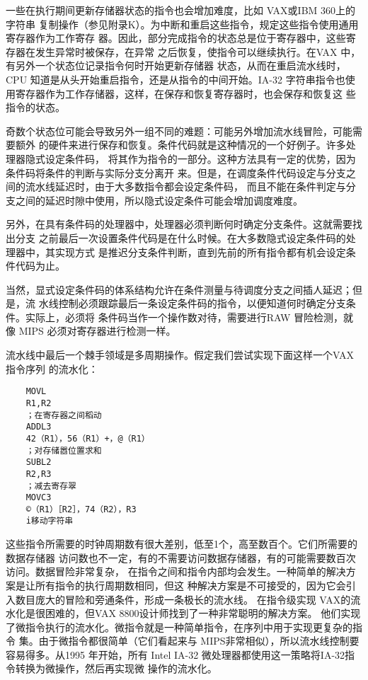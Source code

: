 一些在执行期间更新存储器状态的指令也会增加难度，比如 VAX或IBM 360上的字符串
复制操作（参见附录K）。为中断和重启这些指令，规定这些指令使用通用寄存器作为工作寄存
器。因此，部分完成指令的状态总是位于寄存器中，这些寄存器在发生异常时被保存，在异常
之后恢复，使指令可以继续执行。在VAX 中，有另外一个状态位记录指令何时开始更新存储器
状态，从而在重启流水线时，CPU 知道是从头开始重启指令，还是从指令的中间开始。IA-32
字符串指令也使用寄存器作为工作存储器，这样，在保存和恢复寄存器时，也会保存和恢复这
些指令的状态。

奇数个状态位可能会导致另外一组不同的难题：可能另外增加流水线冒险，可能需要额外
的硬件来进行保存和恢复。条件代码就是这种情况的一个好例子。许多处理器隐式设定条件码，
将其作为指令的一部分。这种方法具有一定的优势，因为条件码将条件的判断与实际分支分离开
来。但是，在调度条件代码设定与分支之间的流水线延迟时，由于大多数指令都会设定条件码，
而且不能在条件判定与分支之间的延迟时隙中使用，所以隐式设定条件可能会增加调度难度。

另外，在具有条件码的处理器中，处理器必须判断何时确定分支条件。这就需要找出分支
之前最后一次设置条件代码是在什么时候。在大多数隐式设定条件码的处理器中，其实现方式
是推迟分支条件判断，直到先前的所有指令都有机会设定条件代码为止。

当然，显式设定条件码的体系结构允许在条件测量与待调度分支之间插人延迟；但是，流
水线控制必须跟踪最后一条设定条件码的指令，以便知道何时确定分支条件。实际上，必须将
条件码当作一个操作数对待，需要进行RAW 冒险检测，就像 MIPS 必须对寄存器进行检测一样。

流水线中最后一个棘手领域是多周期操作。假定我们尝试实现下面这样一个VAX 指令序列
的流水化：
\begin{verbatim}
    MOVL
    R1,R2
    ；在寄存器之间稻动
    ADDL3
    42（R1），56（R1）+，@（R1）
    ；对存储嚣位置求和
    SUBL2
    R2,R3
    ；减去寄存翠
    MOVC3
    ©（R1）［R2］，74（R2），R3
    i移动字符串
\end{verbatim}
这些指令所需要的时钟周期数有很大差别，低至1个，高至数百个。它们所需要的数据存储器
访问数也不一定，有的不需要访问数据存储器，有的可能需要数百次访问。数据冒险非常复杂，
在指令之间和指令内部均会发生。一种简单的解决方案是让所有指令的执行周期数相同，但这
种解决方案是不可接受的，因为它会引入数目庞大的冒险和旁通条件，形成一条极长的流水线。
在指令级实现 VAX的流水化是很困难的，但VAX 8800设计师找到了一种非常聪明的解决方案。
他们实现了微指令执行的流水化。微指令就是一种简单指令，在序列中用于实现更复杂的指令
集。由于微指令都很简单（它们看起来与 MIPS非常相似），所以流水线控制要容易得多。从1995
年开始，所有 Intel IA-32 微处理器都使用这一策略将IA-32指令转换为微操作，然后再实现微
操作的流水化。

